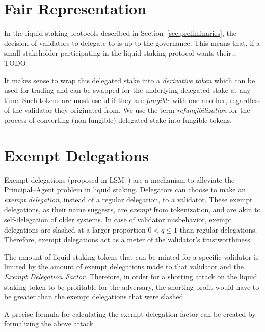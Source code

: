 \section{Fair Representation}

In the liquid staking protocols described in Section~\ref{sec:preliminaries},
the decision of validators to delegate to is up to the governance.
This means that, if a small stakeholder
participating in the liquid staking protocol wants their... TODO

\cite{mill1862true}

It makes sense to wrap this delegated
stake into a \emph{derivative token} which can be used for trading and can
be swapped for the underlying delegated stake at any time. Such tokens
are most useful if they are \emph{fungible} with one another, regardless
of the validator they originated from. We use the term
\emph{refungibilization} for the process of converting (non-fungible) delegated stake
into fungible tokens.

\section{Exempt Delegations}

Exempt delegations (proposed in LSM~\cite{liquidity-staking-module})
are a mechanism to alleviate
the Principal--Agent problem in liquid staking.
Delegators can choose to make an \emph{exempt delegation},
instead of a regular delegation, to a validator.
These exempt delegations, as their name suggests,
are \emph{exempt} from tokenization,
and are akin to self-delegation of older systems.
In case of validator misbehavior, exempt delegations
are slashed at a larger proportion $0 < q \leq 1$ than regular delegations.
Therefore, exempt delegations act as a meter of the
validator's trustworthiness.

The amount of liquid staking tokens that can be
minted for a specific validator is limited by the amount of
exempt delegations made to that validator and the \emph{Exempt Delegation Factor}.
Therefore, in order for a shorting attack on the liquid staking
token to be profitable for the adversary, the shorting profit would
have to be greater than the exempt delegations that were slashed.

A precise formula for calculating the exempt delegation factor can be
created by formalizing the above attack.

